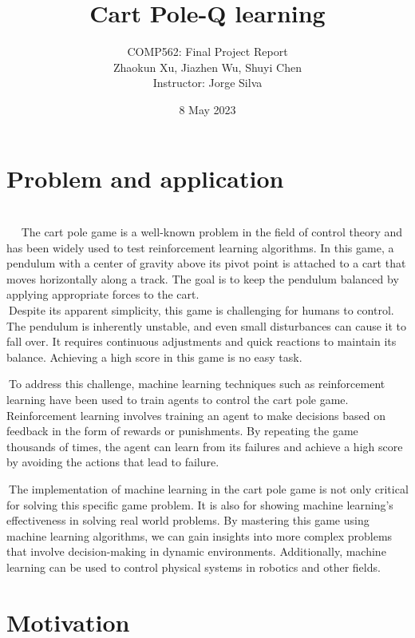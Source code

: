 \documentclass{article}
\title{Cart Pole-Q learning}
\author{COMP562: Final Project Report\\Zhaokun Xu, Jiazhen Wu, Shuyi Chen\\Instructor: Jorge Silva }
\date{8 May 2023}
\begin{document}
 
\maketitle 




 	
\section{Problem and application}\\

$\>$    $\>$   $\>$The cart pole game is a well-known problem in the field of control theory and has been widely used to test reinforcement learning algorithms. In this game, a pendulum with a center of gravity above its pivot point is attached to a cart that moves horizontally along a track. The goal is to keep the pendulum balanced by applying appropriate forces to the cart.\\

$\>$Despite its apparent simplicity, this game is challenging for humans to control. The pendulum is inherently unstable, and even small disturbances can cause it to fall over. It requires continuous adjustments and quick reactions to maintain its balance. Achieving a high score in this game is no easy task.


$\>$To address this challenge, machine learning techniques such as reinforcement learning have been used to train agents to control the cart pole game. Reinforcement learning involves training an agent to make decisions based on feedback in the form of rewards or punishments. By repeating the game thousands of times, the agent can learn from its failures and achieve a high score by avoiding the actions that lead to failure.

$\>$The implementation of machine learning in the cart pole game is not only critical for solving this specific game problem. It is also for showing machine learning's effectiveness in solving real world problems. By mastering this game using machine learning algorithms, we can gain insights into more complex problems that involve decision-making in dynamic environments. Additionally, machine learning can be used to control physical systems in robotics and other fields.


\section{Motivation}
\end{document}
